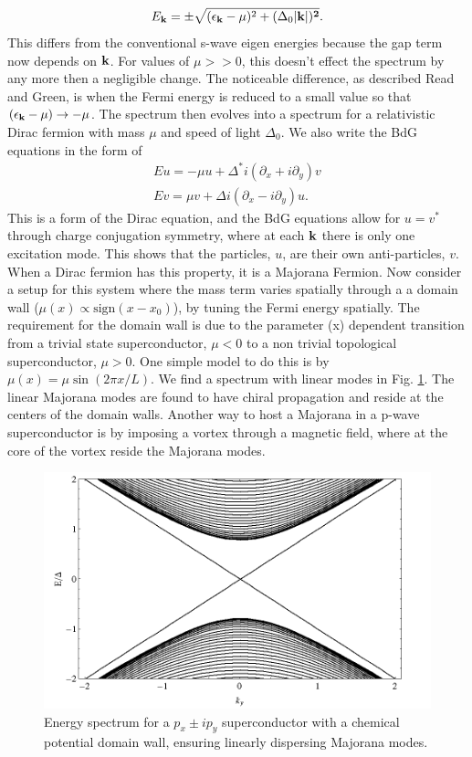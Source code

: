 \begin{equation}
E_{\bf{k}}=\pm\sqrt{(\epsilon_{\bf{k}}-\mu)^2 + (\Delta_0|\bf{k}|)^2}.
\end{equation}
This differs from the conventional s-wave eigen energies because the gap term now depends on $\bf{k}$. For values of $\mu>>0$, this doesn't effect the spectrum by any more then a negligible change. The noticeable difference, as described Read and Green\cite{RG}, is when the Fermi energy is reduced to a small value so that $(\epsilon_{\bf{k}}-\mu) \rightarrow -\mu$. The spectrum then evolves into a spectrum for a relativistic Dirac fermion with mass $\mu$ and speed of light $\Delta_0$. We also write the BdG equations in the form of
\begin{eqnarray}
E u=-\mu u + \Delta^\ast i (\partial_x + i \partial_y) v\\
E v=\mu v + \Delta i (\partial_x - i \partial_y) u.
\end{eqnarray}
This is a form of the Dirac equation, and the BdG equations allow for $u=v^\ast$ through charge conjugation symmetry, where at each $\bf{k}$ there is only one excitation mode. This shows that the particles, $u$, are their own anti-particles, $v$. When a Dirac fermion has this property, it is a Majorana Fermion. Now consider a setup for this system where the mass term varies spatially through a a domain wall ($ \mu(x)\propto \text{sign}(x-x_0)$), by tuning the Fermi energy spatially. The requirement for the domain wall is due to the parameter (x) dependent transition from a trivial state superconductor, $\mu<0$ to a non trivial topological superconductor, $\mu>0$. One simple model to do this is by $\mu(x)=\mu \sin(2 \pi x/L)$. We find a spectrum with linear modes in Fig. \ref{pmajorana}. The linear Majorana modes are found to have chiral propagation and reside at the centers of the domain walls. Another way to host a Majorana in a p-wave superconductor is by imposing a vortex through a magnetic field, where at the core of the vortex reside the Majorana modes. 


\begin{figure}[h]
\center
\includegraphics[width=.95 \textwidth]{include/pmajorana.png}
\caption{Energy spectrum for a $p_x\pm ip_y$ superconductor with a chemical potential domain wall, ensuring linearly dispersing Majorana modes.
} \label{pmajorana}
\end{figure}

